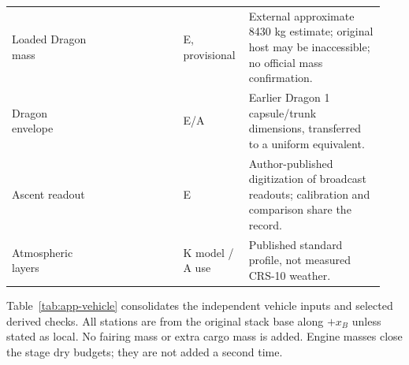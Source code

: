 \begin{longtable}{@{}>{\raggedright\arraybackslash}p{0.23\linewidth}>{\raggedright\arraybackslash}p{0.21\linewidth}>{\raggedright\arraybackslash}p{0.15\linewidth}>{\raggedright\arraybackslash}p{0.35\linewidth}@{}}
Loaded Dragon mass & \cite{kyledatasheet} & E, provisional & External approximate 8430 kg estimate; original host may be inaccessible; no official mass confirmation. \\
Dragon envelope & \cite[p.26 / PDF p.27]{crs1presskit} & E/A & Earlier Dragon 1 capsule/trunk dimensions, transferred to a uniform equivalent. \\
Ascent readout & \cite{crs10webcast,crs10telemetry} & E & Author-published digitization of broadcast readouts; calibration and comparison share the record. \\
Atmospheric layers & \cite{ussa1976} & K model / A use & Published standard profile, not measured CRS-10 weather. \\
\end{longtable}\endgroup

Table~\ref{tab:app-vehicle} consolidates the independent vehicle inputs and selected derived checks. All stations are from the original stack base along $+x_B$ unless stated as local. No fairing mass or extra cargo mass is added. Engine masses close the stage dry budgets; they are not added a second time.

